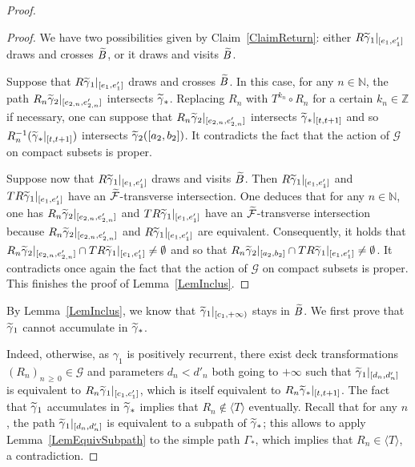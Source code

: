 \documentclass[10pt,a4paper]{article}
\theoremstyle{definition}
\theoremstyle{plain}
\numberwithin{equation}{section}
\numberwithin{figure}{section}
\newcommand{\N}{\mathbb{N}}
\newcommand{\Z}{\mathbb{Z}}
\newcommand{\G}{\mathcal{G}}
\newcommand{\F}{\mathcal{F}}
\let\oldtilde\tilde
\renewcommand*{\tilde}[1]{\mathchoice{\widetilde{#1}}{\widetilde{#1}}{\oldtilde{#1}}{\oldtilde{#1}}}
\begin{document}
\begin{proof}
\begin{proof}
We have two possibilities given by Claim~\ref{ClaimReturn}: either $R\tilde\gamma_1|_{[e_1,e_1']}$ draws and crosses $\tilde B$, or it draws and visits $\tilde B$.

Suppose that $R\tilde\gamma_1|_{[e_1,e_1']}$ draws and crosses $\tilde B$. In this case, for any $n\in\N$, the path $R_n \tilde\gamma_2|_{[e_{2,n},e'_{2,n}]}$ intersects $\tilde\gamma_*$. Replacing $R_n$ with $T^{k_n}\circ R_n$ for a certain $k_n\in\Z$ if necessary, one can suppose that $R_n \tilde\gamma_2|_{[e_{2,n},e'_{2,n}]}$ intersects $\tilde\gamma_*|_{[t,t+1]}$ and so $R_n^{-1}(\tilde\gamma_*|_{[t,t+1]})$ intersects $\tilde \gamma_2([a_2,b_2])$. It contradicts the fact that the action of $\G$ on compact subsets is proper.

Suppose now that $R\tilde\gamma_1|_{[e_1,e_1']}$ draws and visits $\tilde B$. Then $R\tilde\gamma_1|_{[e_1,e_1']}$ and $TR\tilde\gamma_1|_{[e_1,e_1']}$ have an $\tilde{\F}$-transverse intersection. One deduces that for any $n\in\N$, one has $R_n \tilde\gamma_2|_{[e_{2,n},e'_{2,n}]}$ and $TR\tilde\gamma_1|_{[e_1,e_1']}$ have an $\tilde{\F}$-transverse intersection because $R_n \tilde\gamma_2|_{[e_{2,n},e'_{2,n}]}$ and $R\tilde\gamma_1|_{[e_1,e_1']}$ are equivalent. Consequently, it holds that $R_n \tilde\gamma_2|_{[e_{2,n},e'_{2,n}]}\cap TR\tilde\gamma_1|_{[e_1,e_1']}\linebreak\not =\emptyset$ and so that $R_n \tilde\gamma_2|_{[a_2,b_2]}\cap TR\tilde\gamma_1|_{[e_1,e_1']}\not =\emptyset$. It contradicts once again the fact that the action of $\G$ on compact subsets is proper. This finishes the proof of Lemma~\ref{LemInclus}.
\end{proof}


By Lemma~\ref{LemInclus}, we know that $\tilde\gamma_1|_{[c_1,+\infty)}$ stays in $\tilde B$. We first prove that $\tilde\gamma_1$ cannot accumulate in $\tilde\gamma_*$.

Indeed, otherwise, as $\gamma_1$ is positively recurrent, there exist deck transformations $(R_n)_{n\,\ge\,0}\in \G$ and parameters $d_n<d'_n$ both going to $+\infty$ such that $\tilde\gamma_1|_{[d_n,d'_n]}$ is equivalent to $R_n\tilde\gamma_1|_{[c_1,c'_1]}$, which is itself equivalent to $R_n\tilde\gamma_*|_{[t,t+1]}$. The fact that $\tilde\gamma_1$ accumulates in $\tilde\gamma_*$ implies that $R_n\notin\langle T \rangle$ eventually. Recall that for any $n$, the path $\tilde\gamma_1|_{[d_n,d'_n]}$ is equivalent to a subpath of $\tilde\gamma_*$; this allows to apply Lemma~\ref{LemEquivSubpath} to the simple path $\Gamma_*$, which implies that $R_n\in\langle T \rangle$, a contradiction.


\end{proof}
\end{document}
